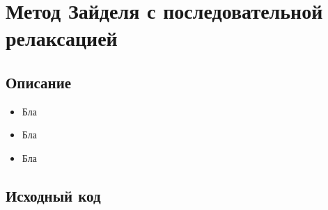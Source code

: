 \documentclass[../../report.tex]{subfiles}
\begin{document}
\chapter{Метод Зайделя с последовательной релаксацией}

\section{Описание}
\begin{itemize}
    \item Бла
    \item Бла
    \item Бла
\end{itemize}

\section{Исходный код}
\end{document}
